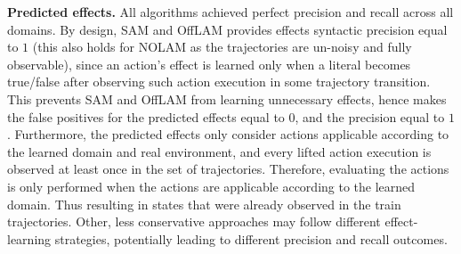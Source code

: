 \documentclass{article}
\newcommand{\miniparagraph}[1]{\textbf{#1.}}
\theoremstyle{definition}
\theoremstyle{remark}
\newcommand{\nolam}{NOLAM\xspace}
\newcommand{\offlam}{OffLAM\xspace}
\newcommand{\samshort}{SAM}
\newif\ifaddcomments
\newcommand{\roni}[1]{\ifaddcomments{\textcolor{red}{[Roni: #1]}}\fi}
\begin{document}
\miniparagraph{Predicted effects} 
All algorithms achieved perfect precision and recall across all domains. 
By design, \samshort{} and \offlam{} provides effects syntactic precision equal to $1$ (this also holds for \nolam{} as the trajectories are un-noisy and fully observable), since an action's effect is learned only when a literal becomes true/false after observing such action execution in some trajectory transition. This prevents \samshort{} and \offlam{} from learning unnecessary effects, hence makes the false positives for the predicted effects equal to $0$, and the precision equal to $1$. 
Furthermore, the predicted effects only consider actions applicable according to the learned domain and real environment, and every lifted action execution is observed at least once in the set of trajectories. Therefore, evaluating the actions is only performed when the actions are applicable according to the learned domain. Thus resulting in states that were already observed in the train trajectories.
Other, less conservative approaches may follow different effect-learning strategies, potentially leading to different precision and recall outcomes.

\end{document}
